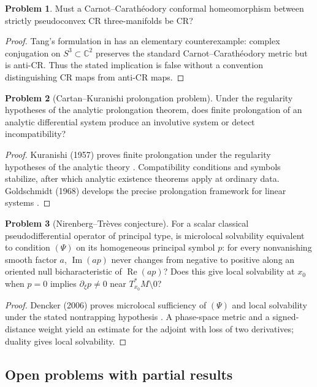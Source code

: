 \documentclass[11pt,reqno]{amsart}
\theoremstyle{definition}
\newtheorem{problem}{Problem}[section]
\theoremstyle{remark}
\begin{document}
\begin{problem}\label{b95-12-3-1}
Must a Carnot--Carath\'eodory conformal homeomorphism between strictly pseudoconvex CR three-manifolds be CR?
\end{problem}
\begin{proof}
Tang's formulation in \cite[Problem~12.3.1]{B95} has an elementary counterexample: complex conjugation on $S^3\subset\mathbb C^2$ preserves the standard Carnot--Carath\'eodory metric but is anti-CR. Thus the stated implication is false without a convention distinguishing CR maps from anti-CR maps.
\end{proof}

\begin{problem}[Cartan--Kuranishi prolongation problem]\label{Siu-2.1-analytic}
Under the regularity hypotheses of the analytic prolongation theorem, does finite prolongation of an analytic differential system produce an involutive system or detect incompatibility?
\end{problem}
\begin{proof}
Kuranishi (1957) proves finite prolongation under the regularity hypotheses of the analytic theory \cite{SIU-Kur57}. Compatibility conditions and symbols stabilize, after which analytic existence theorems apply at ordinary data. Goldschmidt (1968) develops the precise prolongation framework for linear systems \cite{SIU-Gol68}.
\end{proof}

\begin{problem}[Nirenberg--Tr\`eves conjecture]\label{Siu-2.9}
For a scalar classical pseudodifferential operator of principal type, is microlocal solvability equivalent to condition $(\Psi)$ on its homogeneous principal symbol $p$: for every nonvanishing smooth factor $a$, $\operatorname{Im}(ap)$ never changes from negative to positive along an oriented null bicharacteristic of $\operatorname{Re}(ap)$? Does this give local solvability at $x_0$ when $p=0$ implies $\partial_\xi p\ne0$ near $T^*_{x_0}M\setminus0$?
\end{problem}
\begin{proof}
Dencker (2006) proves microlocal sufficiency of $(\Psi)$ and local solvability under the stated nontrapping hypothesis \cite{SIU-Den06}. A phase-space metric and a signed-distance weight yield an estimate for the adjoint with loss of two derivatives; duality gives local solvability.
\end{proof}

\subsection{Open problems with partial results}
\end{document}
